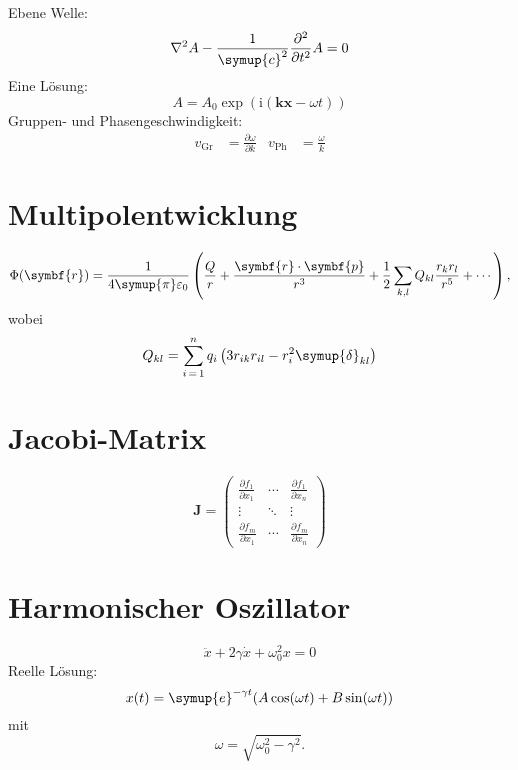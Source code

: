 \documentclass{scrartcl}
\begin{document}
Ebene Welle:
\begin{equation}
  \nabla^2 A - \frac{1}{\symup{c}^2} \frac{\partial^2}{\partial t^2} A = 0
\end{equation}
Eine Lösung:
\begin{equation}
  A = A_0 \exp(\mathrm{i} (\symbf{k} \symbf{x} - \omega t))
\end{equation}
Gruppen- und Phasengeschwindigkeit:
\begin{align}
  v_\text{Gr} &= \frac{\partial \omega}{\partial k} &
  v_\text{Ph} &= \frac{\omega}{k}
\end{align}

\section{Multipolentwicklung}

\begin{equation}
  \Phi(\symbf{r}) = \frac{1}{4 \symup{\pi} \varepsilon_0} \left(
    \frac{Q}{r} + \frac{\symbf{r} \cdot \symbf{p}}{r^3}
    + \frac{1}{2} \sum_{k, l} Q_{k l} \frac{r_k r_l}{r^5} + \dotsb
  \right) ,
\end{equation}
wobei
\begin{equation*}
  Q_{k l} = \sum_{i\,=\,1}^n q_i \left( 3 r_{i k} r_{i l} - r_i^2 \symup{\delta}_{k l} \right)
\end{equation*}

\section{Jacobi-Matrix}

\begin{equation}
  \symbf{J} =
  \begin{pmatrix}
    \frac{\partial f_1}{\partial x_1} & \cdots  & \frac{\partial f_1}{\partial x_n} \\
    \vdots                            & \ddots  & \vdots                            \\
    \frac{\partial f_m}{\partial x_1} & \cdots  & \frac{\partial f_m}{\partial x_n}
  \end{pmatrix}
\end{equation}

\section{Harmonischer Oszillator}

\begin{equation}
  \ddot{x} + 2 \gamma \dot{x} + \omega_0^2 x = 0
\end{equation}
Reelle Lösung:
\begin{equation}
  x(t) = \symup{e}^{-\gamma t} (A \cos(\omega t) + B \sin(\omega t))
\end{equation}
mit
\begin{equation}
  \omega = \sqrt{\omega_0^2 - \gamma^2} .
\end{equation}
\end{document}
